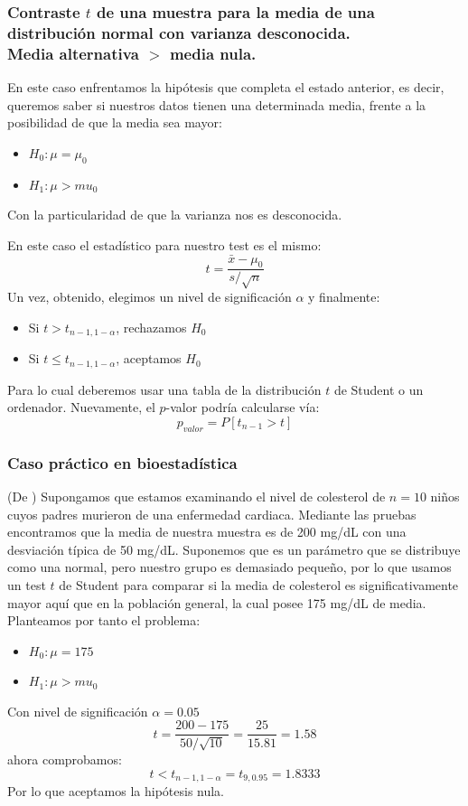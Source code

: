 \documentclass[a4paper,12pt]{article}
\begin{document}
 \subsubsection{Contraste $t$ de una muestra para la media de una distribución normal con varianza desconocida. \\ Media alternativa $>$ media nula.}
 En este caso enfrentamos la hipótesis que completa el estado anterior, es decir, queremos saber si nuestros datos tienen una determinada media, frente a la posibilidad  de que la media sea mayor: 
 \begin{itemize}
 	\item $H_0:\mu=\mu_0$
 	\item $H_1: \mu>mu_0$
 \end{itemize}
 Con la particularidad de que la varianza nos es desconocida.
 
 En este caso el estadístico para nuestro test es el mismo: 
 $$t=\frac{\bar{x}-\mu_0}{s/\sqrt{n}}$$
 Un vez, obtenido, elegimos un nivel de significación $\alpha$ y finalmente:
 \begin{itemize}
 	\item Si $t>t_{n-1,1-\alpha}$, rechazamos $H_0$
 	\item Si $t\leq t_{n-1,1-\alpha}$, aceptamos $H_0$
 \end{itemize}
 Para lo cual deberemos usar una tabla de la distribución $t$ de Student o un ordenador.
 Nuevamente, el $p$-valor podría calcularse vía:
 $$p_{valor}=P[t_{n-1}> t]$$
 
 \subsubsection*{Caso práctico en bioestadística}
 (De \cite{rosner2015fundamentals}) 
Supongamos que estamos examinando el nivel de colesterol de $n=10$ niños cuyos padres murieron de una enfermedad cardiaca. Mediante las pruebas encontramos que la media de nuestra muestra es de 200 mg/dL con una desviación típica de 50 mg/dL. Suponemos que es un parámetro que se distribuye como una normal, pero nuestro grupo es demasiado pequeño, por lo que usamos un test $t$ de Student para comparar si la media de colesterol es significativamente mayor aquí que en la población general, la cual posee 175 mg/dL de media.
Planteamos por tanto el problema:
\begin{itemize}
	\item $H_0:\mu=175$
	\item $H_1: \mu>mu_0$
\end{itemize}
Con nivel de significación $\alpha=0.05$
$$t=\frac{200-175}{50/\sqrt{10}}=\frac{25}{15.81}=1.58$$
ahora comprobamos:
$$t<t_{n-1,1-\alpha}=t_{9,0.95}=1.8333$$
Por lo que aceptamos la hipótesis nula.
\end{document}
